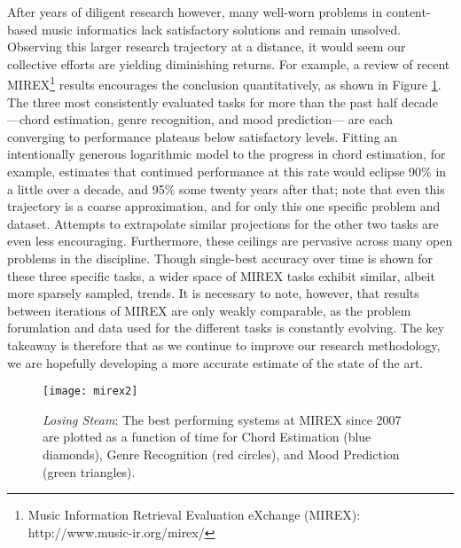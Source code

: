 After years of diligent research however, many well-worn problems in content-based music informatics lack satisfactory solutions and remain unsolved.
Observing this larger research trajectory at a distance, it would seem our collective efforts are yielding diminishing returns.
For example, a review of recent MIREX\footnote{Music Information Retrieval Evaluation eXchange (MIREX): {http://www.music-ir.org/mirex/}} results encourages the conclusion quantitatively, as shown in Figure \ref{fig:mirex}.
The three most consistently evaluated tasks for more than the past half decade ---chord estimation, genre recognition, and mood prediction--- are each converging to performance plateaus below satisfactory levels.
Fitting an intentionally generous logarithmic model to the progress in chord estimation, for example, estimates that continued performance at this rate would eclipse 90\% in a little over a decade, and 95\% some twenty years after that; note that even this trajectory is a coarse approximation, and for only this one specific problem and dataset.
Attempts to extrapolate similar projections for the other two tasks are even less encouraging.
Furthermore, these ceilings are pervasive across many open problems in the discipline.
Though single-best accuracy over time is shown for these three specific tasks, a wider space of MIREX tasks exhibit similar, albeit more sparsely sampled, trends.
It is necessary to note, however, that results between iterations of MIREX are only weakly comparable, as the problem forumlation and data used for the different tasks is constantly evolving.
The key takeaway is therefore that as we continue to improve our research methodology, we are hopefully developing a more accurate estimate of the state of the art.

\begin{figure}
\begin{centering}
\texttt{[image: mirex2]}
\caption{\emph{Losing Steam}: The best performing systems at MIREX since 2007 are plotted as a function of time for Chord Estimation (blue diamonds), Genre Recognition (red circles), and Mood Prediction (green triangles).}
\label{fig:mirex}
\end{centering}
\end{figure}

